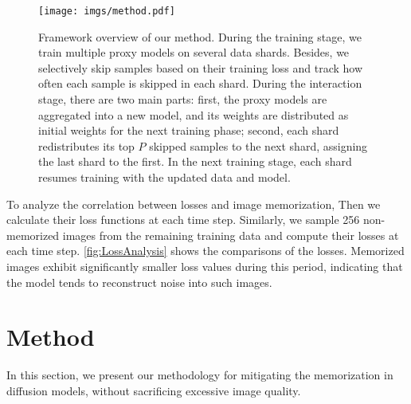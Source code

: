 \begin{figure*}[t]
  \centering
  \setlength{\abovecaptionskip}{7pt} %
  \setlength{\belowcaptionskip}{-7pt} %
  \texttt{[image: imgs/method.pdf]}
  \caption{Framework overview of our method. During the training stage, we train multiple proxy models on several data shards. Besides, we selectively skip samples based on their training loss and track how often each sample is skipped in each shard. During the interaction stage, there are two main parts: first, the proxy models are aggregated into a new model, and its weights are distributed as initial weights for the next training phase; second, each shard redistributes its top $P$ skipped samples to the next shard, assigning the last shard to the first. In the next training stage, each shard resumes training with the updated data and model.}
  \label{fig:method}
\end{figure*}
To analyze the correlation between losses and image memorization,  Then we calculate their loss functions at each time step. 
Similarly, we sample 256 non-memorized images from the remaining training data and compute their losses at each time step.
\cref{fig:LossAnalysis} shows the comparisons of the losses.
Memorized images exhibit significantly smaller loss values during this period, indicating that the model tends to reconstruct noise into such images.


\section{Method}
In this section, we present our methodology for mitigating the memorization in diffusion models, without sacrificing excessive image quality.
